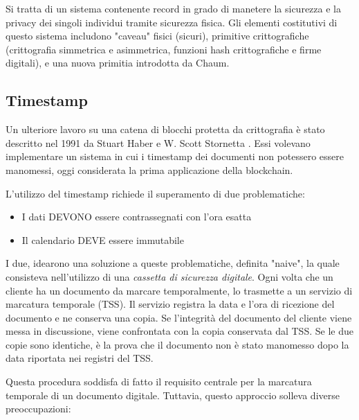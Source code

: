 Si tratta di un sistema contenente record in grado di manetere la sicurezza e la privacy dei singoli individui tramite sicurezza fisica. Gli elementi costitutivi di questo sistema includono "caveau" fisici (sicuri), primitive crittografiche (crittografia simmetrica e asimmetrica, funzioni hash crittografiche e firme digitali), e una nuova primitia introdotta da Chaum.

\subsection{Timestamp}
Un ulteriore lavoro su una catena di blocchi protetta da crittografia è stato descritto nel 1991 da Stuart Haber e W. Scott Stornetta \cite{haber1990time}. Essi volevano implementare un sistema in cui i timestamp dei documenti non potessero essere manomessi, oggi considerata la prima applicazione della blockchain.

L'utilizzo del timestamp richiede il superamento di due problematiche:

\begin{itemize}
  \item I dati DEVONO essere contrassegnati con l'ora esatta
  \item Il calendario DEVE essere immutabile
\end{itemize}

I due, idearono una soluzione a queste problematiche, definita "naive", la quale consisteva nell'utilizzo di una \textit{cassetta di sicurezza digitale}. Ogni volta che un cliente ha un documento da marcare temporalmente, lo trasmette a un servizio di marcatura temporale (TSS). Il servizio registra la data e l'ora di ricezione del documento e ne conserva una copia. Se l'integrità del documento del cliente viene messa in discussione, viene confrontata con la copia conservata dal TSS. Se le due copie sono identiche, è la prova che il documento non è stato manomesso dopo la data riportata nei registri del TSS.

Questa procedura soddisfa di fatto il requisito centrale per la marcatura temporale di un documento digitale. Tuttavia, questo approccio solleva diverse preoccupazioni:

